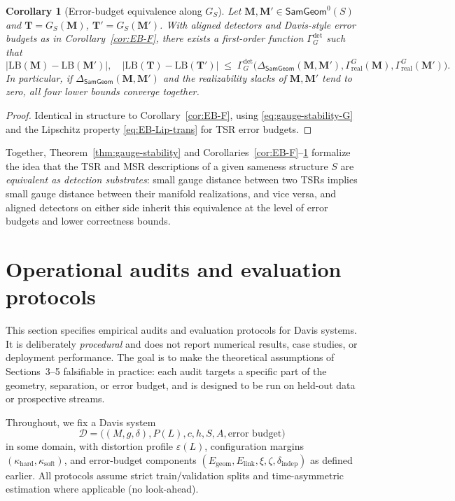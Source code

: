 \documentclass[11pt]{article}
\newtheorem{corollary}{Corollary}
\newcommand{\SamGeom}{\mathsf{SamGeom}}
\begin{document}
\begin{corollary}[Error-budget equivalence along $G_S$]
\label{cor:EB-G}
Let $\mathbf{M},\mathbf{M}' \in \SamGeom^0(S)$ and
$\mathbf{T} = G_S(\mathbf{M})$,
$\mathbf{T}' = G_S(\mathbf{M}')$. With aligned detectors and Davis-style
error budgets as in Corollary~\ref{cor:EB-F}, there exists a first-order
function $\Gamma_G^{\mathrm{det}}$ such that
\[
\bigl|
\mathrm{LB}(\mathbf{M}) - \mathrm{LB}(\mathbf{M}')
\bigr|,
\quad
\bigl|
\mathrm{LB}(\mathbf{T}) - \mathrm{LB}(\mathbf{T}')
\bigr|
\;\le\;
\Gamma_G^{\mathrm{det}}\bigl(
\Delta_{\SamGeom}(\mathbf{M},\mathbf{M}'),
\Gamma_{\mathrm{real}}^{G}(\mathbf{M}),
\Gamma_{\mathrm{real}}^{G}(\mathbf{M}')
\bigr).
\]
In particular, if $\Delta_{\SamGeom}(\mathbf{M},\mathbf{M}')$ and the
realizability slacks of $\mathbf{M},\mathbf{M}'$ tend to zero, all four
lower bounds converge together.
\end{corollary}

\begin{proof}
Identical in structure to Corollary~\ref{cor:EB-F}, using
\eqref{eq:gauge-stability-G} and the Lipschitz property
\eqref{eq:EB-Lip-trans} for TSR error budgets.
\end{proof}

Together, Theorem~\ref{thm:gauge-stability} and
Corollaries~\ref{cor:EB-F}–\ref{cor:EB-G} formalize the idea that the
TSR and MSR descriptions of a given sameness structure $S$ are
\emph{equivalent as detection substrates}: small gauge distance between
two TSRs implies small gauge distance between their manifold
realizations, and vice versa, and aligned detectors on either side
inherit this equivalence at the level of error budgets and lower
correctness bounds.
\section{Operational audits and evaluation protocols}
\label{sec:audits}

This section specifies empirical audits and evaluation protocols for Davis systems.
It is deliberately \emph{procedural} and does not report numerical results, case
studies, or deployment performance. The goal is to make the theoretical assumptions
of Sections~3–5 falsifiable in practice: each audit targets a specific part of the
geometry, separation, or error budget, and is designed to be run on held-out data
or prospective streams.

Throughout, we fix a Davis system
\[
\mathcal{D}
= \bigl( (M,g,\delta), P(L), c, h, S, A, \text{error budget}\bigr)
\]
in some domain, with distortion profile $\varepsilon(L)$, configuration margins
$(\kappa_{\mathrm{hard}},\kappa_{\mathrm{soft}})$, and error-budget components
$(E_{\mathrm{geom}}, E_{\mathrm{link}}, \xi, \zeta, \delta_{\mathrm{indep}})$
as defined earlier. All protocols assume strict train/validation splits and
time-asymmetric estimation where applicable (no look-ahead).
\end{document}
